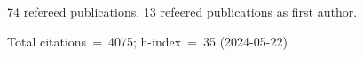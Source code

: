 74 refereed publications. 13 refeered publications as first author.

Total citations~=~4075; h-index~=~35 (2024-05-22)